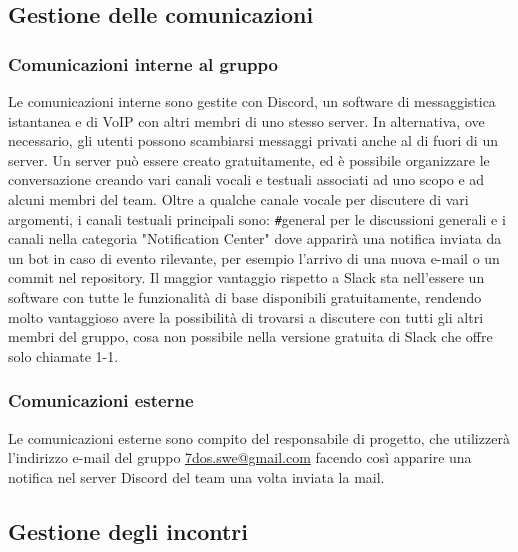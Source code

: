 \subsection{Gestione delle comunicazioni}
\subsubsection{Comunicazioni interne al gruppo}
Le comunicazioni interne sono gestite con Discord, un software di messaggistica istantanea e di VoIP con altri membri di uno stesso server. In alternativa, ove necessario, gli utenti possono scambiarsi messaggi privati anche al di fuori di un server.
Un server può essere creato gratuitamente, ed è possibile organizzare le conversazione creando vari canali vocali e testuali associati ad uno scopo e ad alcuni membri del team.\newline
Oltre a qualche canale vocale per discutere di vari argomenti, i canali testuali principali sono: \verb|#|general per le discussioni generali e i canali nella categoria "Notification Center" dove apparirà una notifica inviata da un bot in caso di evento rilevante, per esempio l'arrivo di una nuova e-mail o un commit nel repository.
\newline
Il maggior vantaggio rispetto a Slack sta nell'essere un software con tutte le funzionalità di base disponibili gratuitamente, rendendo molto vantaggioso avere la possibilità di trovarsi a discutere con tutti gli altri membri del gruppo, cosa non possibile nella versione gratuita di Slack che offre solo chiamate 1-1.

\subsubsection{Comunicazioni esterne}
Le comunicazioni esterne sono compito del responsabile di progetto, che utilizzerà l'indirizzo e-mail del gruppo \href{mailto:7dos.swe@gmail.com}{7dos.swe@gmail.com} facendo così apparire una notifica nel server Discord del team una volta inviata la mail.

\subsection{Gestione degli incontri}
